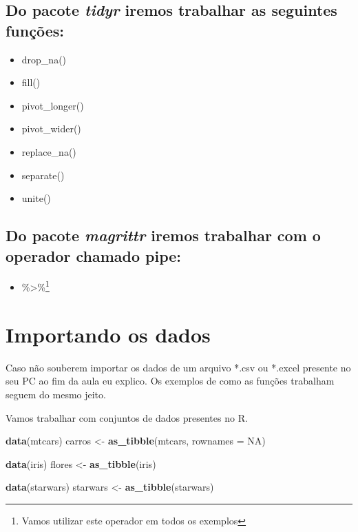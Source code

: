 \documentclass[]{book}
\newenvironment{Shaded}{\begin{snugshade}}{\end{snugshade}}
\newcommand{\DataTypeTok}[1]{\textcolor[rgb]{0.13,0.29,0.53}{#1}}
\newcommand{\KeywordTok}[1]{\textcolor[rgb]{0.13,0.29,0.53}{\textbf{#1}}}
\newcommand{\NormalTok}[1]{#1}
\newcommand{\OtherTok}[1]{\textcolor[rgb]{0.56,0.35,0.01}{#1}}
\newcommand{\StringTok}[1]{\textcolor[rgb]{0.31,0.60,0.02}{#1}}
\providecommand{\tightlist}{%
  \setlength{\itemsep}{0pt}\setlength{\parskip}{0pt}}
\begin{document}
\hypertarget{do-pacote-tidyr-iremos-trabalhar-as-seguintes-funuxe7uxf5es}{%
\subsection{\texorpdfstring{Do pacote \emph{tidyr} iremos trabalhar as seguintes funções:}{Do pacote tidyr iremos trabalhar as seguintes funções:}}\label{do-pacote-tidyr-iremos-trabalhar-as-seguintes-funuxe7uxf5es}}

\begin{itemize}
\tightlist
\item
  drop\_na()
\item
  fill()
\item
  pivot\_longer()
\item
  pivot\_wider()
\item
  replace\_na()
\item
  separate()
\item
  unite()
\end{itemize}

\hypertarget{do-pacote-magrittr-iremos-trabalhar-com-o-operador-chamado-pipe}{%
\subsection{\texorpdfstring{Do pacote \emph{magrittr} iremos trabalhar com o operador chamado \textbf{pipe}:}{Do pacote magrittr iremos trabalhar com o operador chamado pipe:}}\label{do-pacote-magrittr-iremos-trabalhar-com-o-operador-chamado-pipe}}

\begin{itemize}
\tightlist
\item
  \%\textgreater{}\%\footnote{Vamos utilizar este operador em todos os exemplos}
\end{itemize}

\hypertarget{importando-os-dados}{%
\section{Importando os dados}\label{importando-os-dados}}

Caso não souberem importar os dados de um arquivo *.csv ou *.excel presente no seu PC ao fim da aula eu explico. Os exemplos de como as funções trabalham seguem do mesmo jeito.

Vamos trabalhar com conjuntos de dados presentes no R.

\begin{Shaded}
\begin{Highlighting}[]
\KeywordTok{data}\NormalTok{(mtcars)}
\NormalTok{carros <-}\StringTok{ }\KeywordTok{as_tibble}\NormalTok{(mtcars, }\DataTypeTok{rownames =} \OtherTok{NA}\NormalTok{)}

\KeywordTok{data}\NormalTok{(iris)}
\NormalTok{flores <-}\StringTok{ }\KeywordTok{as_tibble}\NormalTok{(iris)}

\KeywordTok{data}\NormalTok{(starwars)}
\NormalTok{starwars <-}\StringTok{ }\KeywordTok{as_tibble}\NormalTok{(starwars)}
\end{Highlighting}
\end{Shaded}
\end{document}
